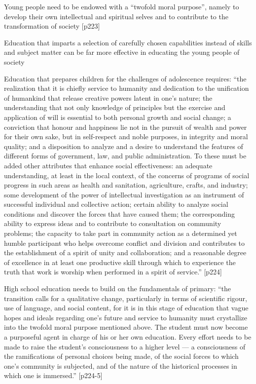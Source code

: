 Young people need to be endowed with a “twofold moral purpose”, namely to develop their own intellectual and spiritual selves and to contribute to the transformation of society [p223] \citep{Arbab2000}

Education that imparts a selection of carefully chosen capabilities instead of skills and subject matter can be far more effective in educating the young people of society \citep{Arbab2000}

Education that prepares children for the challenges of adolescence requires: “the realization that it is chiefly service to humanity and dedication to the unification of humankind that release creative powers latent in one's nature; the understanding that not only knowledge of principles but the exercise and application of will is essential to both personal growth and social change; a conviction that honour and happiness lie not in the pursuit of wealth and power for their own sake, but in self-respect and noble purposes, in integrity and moral quality; and a disposition to analyze and a desire to understand the features of different forms of government, law, and public administration. To these must be added other attributes that enhance social effectiveness: an adequate understanding, at least in the local context, of the concerns of programs of social progress in such areas as health and sanitation, agriculture, crafts, and industry; some development of the power of intellectual investigation as an instrument of successful individual and collective action; certain ability to analyze social conditions and discover the forces that have caused them; the corresponding ability to express ideas and to contribute to consultation on community problems; the capacity to take part in community action as a determined yet humble participant who helps overcome conflict and division and contributes to the establishment of a spirit of unity and collaboration; and a reasonable degree of excellence in at least one productive skill through which to experience the truth that work is worship when performed in a spirit of service.” [p224] \citep{Arbab2000}

High school education needs to build on the fundamentals of primary: “the transition calls for a qualitative change, particularly in terms of scientific rigour, use of language, and social content, for it is in this stage of education that vague hopes and ideals regarding one's future and service to humanity must crystallize into the twofold moral purpose mentioned above. The student must now become a purposeful agent in charge of his or her own education. Every effort needs to be made to raise the student's consciousness to a higher level — a consciousness of the ramifications of personal choices being made, of the social forces to which one's community is subjected, and of the nature of the historical processes in which one is immersed.” [p224-5] \citep{Arbab2000}

